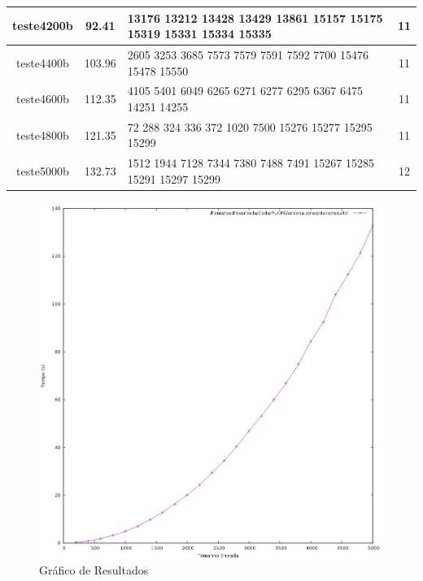 \documentclass[12pt]{article}
\begin{document}
\begin{table}[h]
\begin{tabular}{c | c || p{8cm} | c}
  \hline
  teste4200b & 92.41 & 13176 13212 13428 13429 13861 15157 15175 15319 15331 15334 15335 & 11 \\
  \hline
  teste4400b & 103.96 & 2605 3253 3685 7573 7579 7591 7592 7700 15476 15478 15550 & 11 \\
  \hline
  teste4600b & 112.35 & 4105 5401 6049 6265 6271 6277 6295 6367 6475 14251 14255 & 11 \\
  \hline
  teste4800b & 121.35 & 72 288 324 336 372 1020 7500 15276 15277 15295 15299 & 11 \\
  \hline
  teste5000b & 132.73 & 1512 1944 7128 7344 7380 7488 7491 15267 15285 15291 15297 15299 & 12
\end{tabular}
\end{table}

\begin{figure}[h!]
  \centering
  \includegraphics[width=15cm]{results.png}
  \caption{Gráfico de Resultados}
  \label{fig:resultados}
\end{figure}
\end{document}
